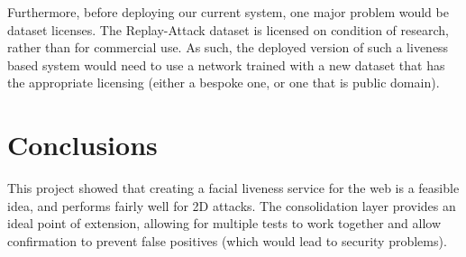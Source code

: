 \documentclass[10pt,a4paper]{article}
\begin{document}
            Furthermore, before deploying our current system, one major problem would be dataset licenses. The Replay-Attack dataset is licensed on condition of research, rather than for commercial use.
            As such, the deployed version of such a liveness based system would need to use a network trained with a new dataset that has the appropriate licensing (either a bespoke one, or one that is public domain).

\section{Conclusions}
    This project showed that creating a facial liveness service for the web is a feasible idea, and performs fairly well for 2D attacks. The consolidation layer provides
    an ideal point of extension, allowing for multiple tests to work together and allow confirmation to prevent false positives (which would lead to security problems).



\end{document}
